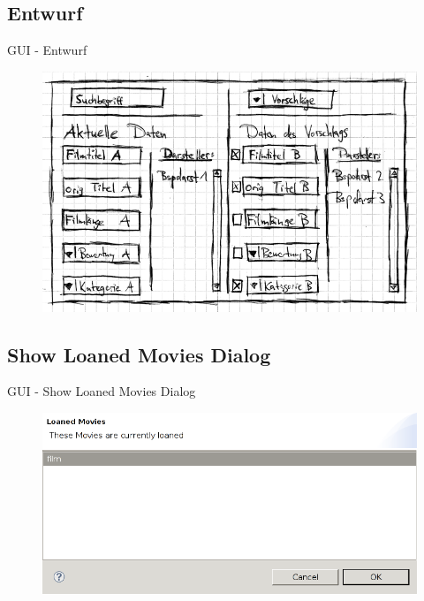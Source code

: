 \documentclass{beamer} %
\begin{document}
	\subsection{Entwurf}
	\begin{frame}{GUI - Entwurf}
		\begin{figure}[H]
			\centering
			\includegraphics[width=\linewidth]{gui-mockup.png}
		\end{figure}
	\end{frame}

	\subsection{Show Loaned Movies Dialog}
	\begin{frame}{GUI - Show Loaned Movies Dialog}
		\begin{figure}[H]
			\centering
			\includegraphics[width=\linewidth]{show-loaned-movies-dialog.png}
		\end{figure}
	\end{frame}
\end{document}
